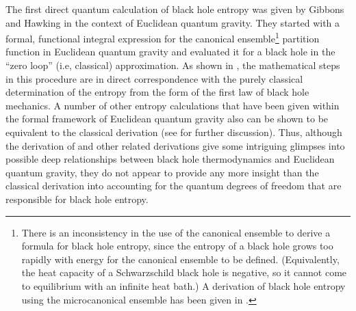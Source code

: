 The first direct quantum calculation of black hole entropy was given
by Gibbons and Hawking \cite{gh} in the context of Euclidean quantum
gravity. They started with a formal, functional integral expression
for the canonical ensemble\footnote{There is an inconsistency in the
use of the canonical ensemble to derive a formula for black hole
entropy, since the entropy of a black hole grows too rapidly with
energy for the canonical ensemble to be defined. (Equivalently, the
heat capacity of a Schwarzschild black hole is negative, so it cannot
come to equilibrium with an infinite heat bath.) A derivation
of black hole entropy using the microcanonical ensemble has been given
in \cite{by2}.} partition function in Euclidean quantum gravity and
evaluated it for a black hole in the ``zero loop'' (i.e, classical)
approximation. As shown in \cite{w6}, the mathematical steps in this
procedure are in direct correspondence with the purely classical
determination of the entropy from the form of the first law of black
hole mechanics. A number of other entropy calculations that have been
given within the formal framework of Euclidean quantum gravity also
can be shown to be equivalent to the classical derivation (see
\cite{iw2} for further discussion). Thus, although the derivation of
\cite{gh} and other related derivations give some intriguing glimpses
into possible deep relationships between black hole thermodynamics and
Euclidean quantum gravity, they do not appear to provide any more
insight than the classical derivation into accounting for the quantum
degrees of freedom that are responsible for black hole entropy.


